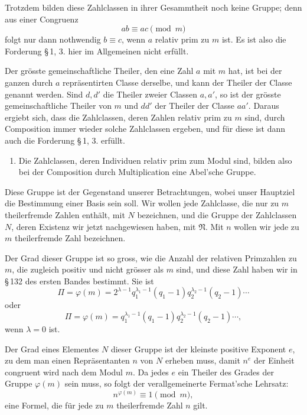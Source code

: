 \documentclass[11pt]{article}
\begin{document}
Trotzdem bilden diese Zahlclassen in ihrer Gesammtheit noch keine Gruppe; denn aus einer Congruenz
\[
ab\equiv ac\pmod m
\]
folgt nur dann nothwendig $b\equiv c$, wenn $a$ relativ prim zu $m$ ist. Es ist also die Forderung \S\,1, 3. hier im Allgemeinen nicht erfüllt.

Der grösste gemeinschaftliche Theiler, den eine Zahl $a$ mit $m$ hat, ist bei der ganzen durch $a$ repräsentirten Classe derselbe, und kann der Theiler der Classe genannt werden. Sind $d,d'$ die Theiler zweier Classen $a,a'$, so ist der grösste gemeinschaftliche Theiler von $m$ und $dd'$ der Theiler der Classe $aa'$. Daraus ergiebt sich, dass die Zahlclassen, deren Zahlen relativ prim zu $m$ sind, durch Composition immer wieder solche Zahlclassen ergeben, und für diese ist dann auch die Forderung \S\,1, 3. erfüllt.

\begin{enumerate}[label=\arabic*.]
\item Die Zahlclassen, deren Individuen relativ prim zum Modul sind, bilden also bei der Composition durch Multiplication eine Abel'sche Gruppe.
\end{enumerate}

Diese Gruppe ist der Gegenstand unserer Betrachtungen, wobei unser Hauptziel die Bestimmung einer Basis sein soll. Wir wollen jede Zahlclasse, die nur zu $m$ theilerfremde Zahlen enthält, mit $N$ bezeichnen, und die Gruppe der Zahlclassen $N$, deren Existenz wir jetzt nachgewiesen haben, mit $\mathfrak N$. Mit $n$ wollen wir jede zu $m$ theilerfremde Zahl bezeichnen.

Der Grad dieser Gruppe ist so gross, wie die Anzahl der relativen Primzahlen zu $m$, die zugleich positiv und nicht grösser als $m$ sind, und diese Zahl haben wir in \S\,132 des ersten Bandes bestimmt. Sie ist
\begin{equation}
\Pi=\varphi(m)=2^{\lambda-1}q_1^{\lambda_1-1}(q_1-1)q_2^{\lambda_2-1}(q_2-1)\cdots
\tag{2}
\end{equation}
oder
\[
\Pi=\varphi(m)=q_1^{\lambda_1-1}(q_1-1)q_2^{\lambda_2-1}(q_2-1)\cdots,
\]
wenn $\lambda=0$ ist.

Der Grad eines Elementes $N$ dieser Gruppe ist der kleinste positive Exponent $e$, zu dem man einen Repräsentanten $n$ von $N$ erheben muss, damit $n^e$ der Einheit congruent wird nach dem Modul $m$. Da jedes $e$ ein Theiler des Grades der Gruppe $\varphi(m)$ sein muss, so folgt der verallgemeinerte Fermat'sche Lehrsatz:
\begin{equation}
n^{\varphi(m)}\equiv1\pmod m,
\tag{3}
\end{equation}
eine Formel, die für jede zu $m$ theilerfremde Zahl $n$ gilt.
\end{document}

